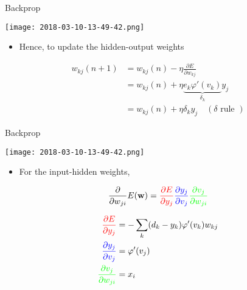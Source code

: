 \documentclass[notes]{beamer}
\providecommand{\tightlist}{%
  \setlength{\itemsep}{0pt}\setlength{\parskip}{0pt}}
\begin{document}
\begin{frame}{Backprop}

\centering 

\texttt{[image: 2018-03-10-13-49-42.png]}\\

\begin{itemize}
\tightlist
\item
  Hence, to update the hidden-output weights
\end{itemize}

\begin{align}
    w_{kj} (n+1 ) & = w_{kj} (n) - \eta \frac{\partial E}{\partial w_{kj}} \\
    &= w_{kj} (n) + \eta \underbrace{ e_k \varphi ' (v_k)  }_{\delta_k} y_j  \\ 
    &= w_{kj}(n) + \eta \delta_k y_j \quad (\delta \textrm{ rule }) 
\end{align}

\end{frame}

\begin{frame}{Backprop}

\centering 

\texttt{[image: 2018-03-10-13-49-42.png]}\\

\begin{itemize}
\tightlist
\item
  For the input-hidden weights,
\end{itemize}

\begin{equation}
  \frac{\partial }{\partial w_{ji}} E(\mathbf{w}) = 
    \textcolor{red}{
        \frac{\partial E}{\partial y_j}} 
    \textcolor{blue}{
        \frac{\partial y_j}{\partial v_j}
    } 
    \textcolor{green}{
        \frac{\partial v_j}{\partial w_{ji}}
    }
\end{equation}

\begin{align}
    \textcolor{red}{
        \frac{\partial E}{\partial y_j}
    } & = - \sum_{k}(d_k - y_k) \varphi ' (v_k) w_{kj} \\
    \textcolor{blue}{
        \frac{\partial y_j}{\partial v_j}
    } & = \varphi ' (v_j)                               \\
    \textcolor{green}{
        \frac{\partial v_j}{\partial w_{ji}}
    } & = x_i
\end{align}

\end{frame}
\end{document}
